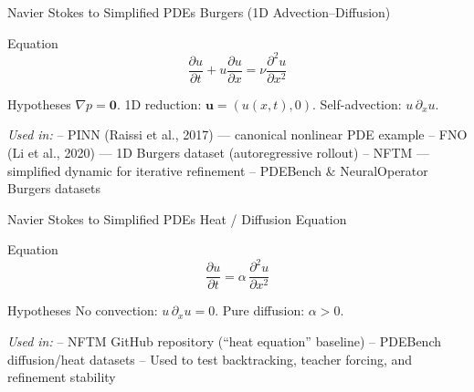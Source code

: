 \begin{frame}{Navier Stokes to Simplified PDEs}
\small
\textcolor{red_unipd}{\Large Burgers (1D Advection–Diffusion)}

\vspace{0.6em}

\begin{alertblock}{Equation}
\[
\dfrac{\partial u}{\partial t} + u\dfrac{\partial u}{\partial x}
= \nu\dfrac{\partial^2 u}{\partial x^2}
\]
\end{alertblock}

\vfill

\begin{block}{Hypotheses}
\(\nabla p=\mathbf{0}\). \quad
1D reduction: \(\mathbf{u}=(u(x,t),0)\). \quad
Self-advection: \(u\,\partial_x u\).
\end{block}

\vspace{0.5em}
\textit{Used in:}  
– PINN (Raissi et al., 2017) — canonical nonlinear PDE example  
– FNO (Li et al., 2020) — 1D Burgers dataset (autoregressive rollout)  
– NFTM — simplified dynamic for iterative refinement  
– PDEBench \& NeuralOperator Burgers datasets
\end{frame}


\begin{frame}{Navier Stokes to Simplified PDEs}
\small
\textcolor{red_unipd}{\Large Heat / Diffusion Equation}

\vspace{0.6em}

\begin{alertblock}{Equation}
\[
\dfrac{\partial u}{\partial t} =
\alpha\,\dfrac{\partial^2 u}{\partial x^2}
\]
\end{alertblock}

\vfill

\begin{block}{Hypotheses}
No convection: \(u\,\partial_x u = 0\). \quad
Pure diffusion: \(\alpha>0\).
\end{block}

\vspace{0.5em}
\textit{Used in:}  
– NFTM GitHub repository (“heat equation” baseline)  
– PDEBench diffusion/heat datasets  
– Used to test backtracking, teacher forcing, and refinement stability
\end{frame}


